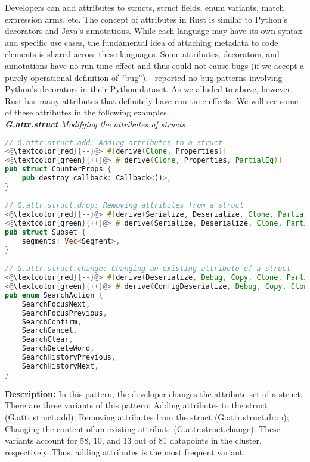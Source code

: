 Developers can add attributes to structs, struct fields, enum variants, match expression arms, etc.
The concept of attributes in Rust is similar to Python's decorators and Java's annotations. While each language may have its own syntax and specific use cases, the fundamental idea of attaching metadata to code elements is shared across these languages. Some attributes, decorators, and annotations have no run-time effect and thus could not cause bugs (if we accept a purely operational definition of ``bug''). \cite{yang2022mining}~reported no bug patterns involving Python's decorators in their Python dataset. As we alluded to above, however, Rust has many attributes that definitely have run-time effects. We will see some of these attributes in the following examples. \\

\noindent\textit{\label{sec:G.attr.struct}\textbf{G.attr.struct} Modifying the attributes of structs}

\begin{lstlisting}[language=Rust, style=colouredRust]
// G.attr.struct.add: Adding attributes to a struct
<@\textcolor{red}{--}@> #[derive(Clone, Properties)]
<@\textcolor{green}{++}@> #[derive(Clone, Properties, PartialEq)]
pub struct CounterProps {
    pub destroy_callback: Callback<()>,
}

// G.attr.struct.drop: Removing attributes from a struct
<@\textcolor{red}{--}@> #[derive(Serialize, Deserialize, Clone, PartialEq, Eq, Debug)]
<@\textcolor{green}{++}@> #[derive(Serialize, Deserialize, Clone, PartialEq, Eq)]
pub struct Subset {
    segments: Vec<Segment>,
}

// G.attr.struct.change: Changing an existing attribute of a struct
<@\textcolor{red}{--}@> #[derive(Deserialize, Debug, Copy, Clone, PartialEq, Eq)]
<@\textcolor{green}{++}@> #[derive(ConfigDeserialize, Debug, Copy, Clone, PartialEq, Eq)]
pub enum SearchAction {
    SearchFocusNext,
    SearchFocusPrevious,
    SearchConfirm,
    SearchCancel,
    SearchClear,
    SearchDeleteWord,
    SearchHistoryPrevious,
    SearchHistoryNext,
}
\end{lstlisting}

\noindent\textbf{Description:} In this pattern, the developer changes the attribute set of a struct. There are three variants of this pattern: Adding attributes to the struct (G.attr.struct.add); Removing attributes from the struct (G.attr.struct.drop); Changing the content of an existing attribute (G.attr.struct.change). These variants account for 58, 10, and 13 out of 81 datapoints in the cluster, respectively. Thus, adding attributes is the most frequent variant. 

